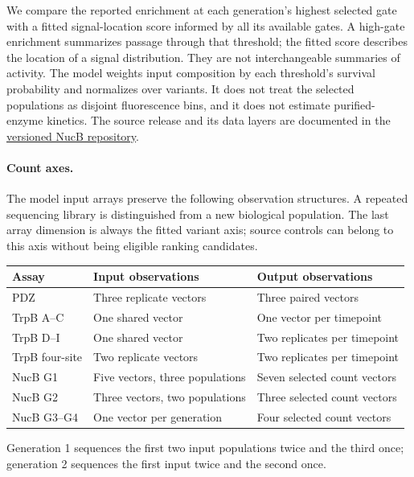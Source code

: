 We compare the reported enrichment at each generation's highest selected
gate with a fitted signal-location score informed by all its available
gates. A high-gate enrichment summarizes passage through that threshold;
the fitted score describes the location of a signal distribution. They
are not interchangeable summaries of activity. The model weights input
composition by each threshold's survival probability and normalizes
over variants. It does not treat the selected populations as disjoint
fluorescence bins, and it does not estimate purified-enzyme kinetics.
The source release and its data layers are documented in the
\href{https://github.com/google-deepmind/nuclease_design/tree/702284847c4558567d8288169a86dc147cfaab32}{versioned NucB repository}.


\paragraph{Count axes.}
The model input arrays preserve the following observation structures. A
repeated sequencing library is distinguished from a new biological population.
The last array dimension is always the fitted variant axis; source controls
can belong to this axis without being eligible ranking candidates.
\begin{center}
\small
\begin{tabular}{lll}
\toprule
Assay & Input observations & Output observations \\
\midrule
PDZ & Three replicate vectors & Three paired vectors \\
TrpB A--C & One shared vector & One vector per timepoint \\
TrpB D--I & One shared vector & Two replicates per timepoint \\
TrpB four-site & Two replicate vectors & Two replicates per timepoint \\
NucB G1 & Five vectors, three populations & Seven selected count vectors \\
NucB G2 & Three vectors, two populations & Three selected count vectors \\
NucB G3--G4 & One vector per generation & Four selected count vectors \\
\bottomrule
\end{tabular}
\end{center}
Generation 1 sequences the first two input populations twice and the third
once; generation 2 sequences the first input twice and the second once.

